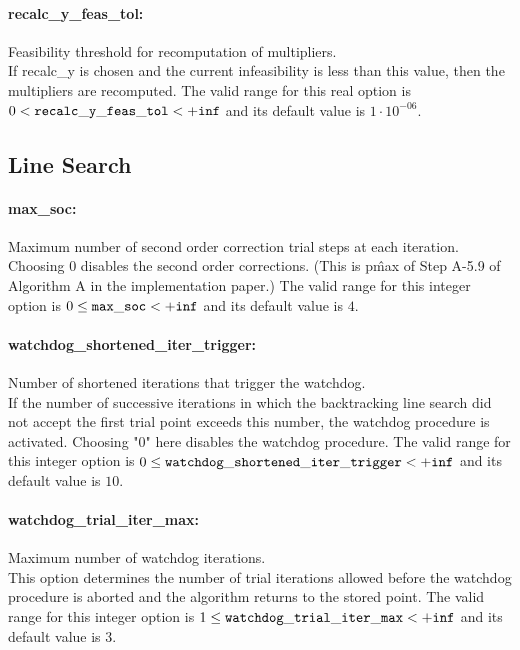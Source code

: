 \paragraph{recalc\_y\_feas\_tol:}\label{sec:recalc_y_feas_tol} Feasibility threshold for recomputation of multipliers. $\;$ \\
 If recalc\_y is chosen and the current
infeasibility is less than this value, then the
multipliers are recomputed. The valid range for this real option is 
$0 <  {\tt recalc\_y\_feas\_tol } <  {\tt +inf}$
and its default value is $1 \cdot 10^{-06}$.


\subsection{Line Search}

\paragraph{max\_soc:}\label{sec:max_soc} Maximum number of second order correction trial steps at each iteration. $\;$ \\
 Choosing 0 disables the second order corrections.
(This is p\^{max} of Step A-5.9 of Algorithm A in
the implementation paper.) The valid range for this integer option is
$0 \le {\tt max\_soc } <  {\tt +inf}$
and its default value is $4$.


\paragraph{watchdog\_shortened\_iter\_trigger:}\label{sec:watchdog_shortened_iter_trigger} Number of shortened iterations that trigger the watchdog. $\;$ \\
 If the number of successive iterations in which
the backtracking line search did not accept the
first trial point exceeds this number, the
watchdog procedure is activated.  Choosing "0"
here disables the watchdog procedure. The valid range for this integer option is
$0 \le {\tt watchdog\_shortened\_iter\_trigger } <  {\tt +inf}$
and its default value is $10$.


\paragraph{watchdog\_trial\_iter\_max:}\label{sec:watchdog_trial_iter_max} Maximum number of watchdog iterations. $\;$ \\
 This option determines the number of trial
iterations allowed before the watchdog procedure
is aborted and the algorithm returns to the
stored point. The valid range for this integer option is
$1 \le {\tt watchdog\_trial\_iter\_max } <  {\tt +inf}$
and its default value is $3$.


